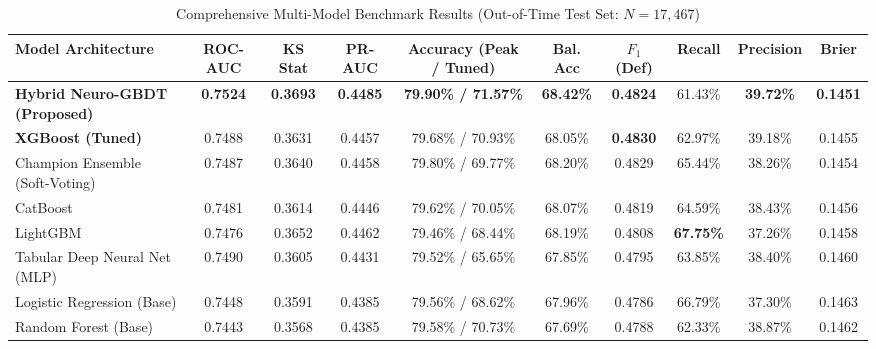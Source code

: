 \documentclass[conference]{IEEEtran}
\begin{document}
\begin{table}[t]
\caption{Comprehensive Multi-Model Benchmark Results (Out-of-Time Test Set: $N = 17,467$)}
\label{tab:benchmark}
\centering
\begin{tabular}{lccccccccc}
\toprule
\textbf{Model Architecture} & \textbf{ROC-AUC} & \textbf{KS Stat} & \textbf{PR-AUC} & \textbf{Accuracy (Peak / Tuned)} & \textbf{Bal. Acc} & \textbf{$F_1$ (Def)} & \textbf{Recall} & \textbf{Precision} & \textbf{Brier} \\
\midrule
\textbf{Hybrid Neuro-GBDT (Proposed)} & \textbf{0.7524} & \textbf{0.3693} & \textbf{0.4485} & \textbf{79.90\% / 71.57\%} & \textbf{68.42\%} & \textbf{0.4824} & 61.43\% & \textbf{39.72\%} & \textbf{0.1451} \\
\textbf{XGBoost (Tuned)} & 0.7488 & 0.3631 & 0.4457 & 79.68\% / 70.93\% & 68.05\% & \textbf{0.4830} & 62.97\% & 39.18\% & 0.1455 \\
Champion Ensemble (Soft-Voting) & 0.7487 & 0.3640 & 0.4458 & 79.80\% / 69.77\% & 68.20\% & 0.4829 & 65.44\% & 38.26\% & 0.1454 \\
CatBoost & 0.7481 & 0.3614 & 0.4446 & 79.62\% / 70.05\% & 68.07\% & 0.4819 & 64.59\% & 38.43\% & 0.1456 \\
LightGBM & 0.7476 & 0.3652 & 0.4462 & 79.46\% / 68.44\% & 68.19\% & 0.4808 & \textbf{67.75\%} & 37.26\% & 0.1458 \\
Tabular Deep Neural Net (MLP) & 0.7490 & 0.3605 & 0.4431 & 79.52\% / 65.65\% & 67.85\% & 0.4795 & 63.85\% & 38.40\% & 0.1460 \\
Logistic Regression (Base) & 0.7448 & 0.3591 & 0.4385 & 79.56\% / 68.62\% & 67.96\% & 0.4786 & 66.79\% & 37.30\% & 0.1463 \\
Random Forest (Base) & 0.7443 & 0.3568 & 0.4385 & 79.58\% / 70.73\% & 67.69\% & 0.4788 & 62.33\% & 38.87\% & 0.1462 \\
\bottomrule
\end{tabular}
\end{table}
\end{document}
